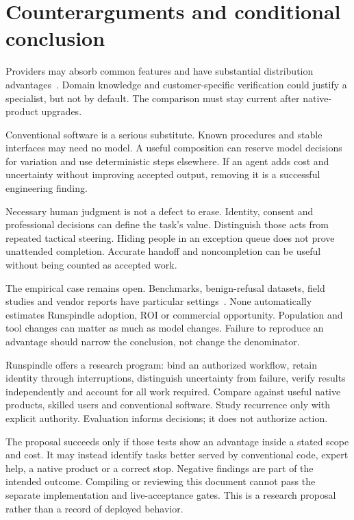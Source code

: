 \documentclass[11pt,letterpaper]{article}
\begin{document}
\section{Counterarguments and conditional conclusion}
\label{sec:conclusion}
Providers may absorb common features and have substantial distribution
advantages~\cite{anthropiceffective,openaiagents}. Domain knowledge and
customer-specific verification could justify a specialist, but not by default.
The comparison must stay current after native-product upgrades.

Conventional software is a serious substitute. Known procedures and stable
interfaces may need no model. A useful composition can reserve model decisions
for variation and use deterministic steps elsewhere. If an agent adds cost and
uncertainty without improving accepted output, removing it is a successful
engineering finding.

Necessary human judgment is not a defect to erase. Identity, consent and
professional decisions can define the task's value. Distinguish those acts from
repeated tactical steering. Hiding people in an exception queue does not prove
unattended completion. Accurate handoff and noncompletion can be useful without
being counted as accepted work.

The empirical case remains open. Benchmarks, benign-refusal datasets, field
studies and vendor reports have particular settings~\cite{xstest,orbench,webarena,taubench,genaiwork}.
None automatically estimates Runspindle adoption, ROI or commercial opportunity.
Population and tool changes can matter as much as model changes. Failure to
reproduce an advantage should narrow the conclusion, not change the denominator.

Runspindle offers a research program: bind an authorized workflow, retain identity
through interruptions, distinguish uncertainty from failure, verify results
independently and account for all work required. Compare against useful native
products, skilled users and conventional software. Study recurrence only with
explicit authority. Evaluation informs decisions; it does not authorize action.

The proposal succeeds only if those tests show an advantage inside a stated
scope and cost. It may instead identify tasks better served by conventional code,
expert help, a native product or a correct stop. Negative findings are part of the
intended outcome. Compiling or reviewing this document cannot pass the separate
implementation and live-acceptance gates. This is a research proposal rather than
a record of deployed behavior.
\end{document}
